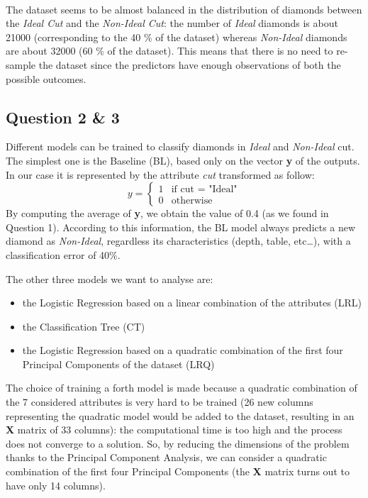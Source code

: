 \documentclass[
]{article}
\providecommand{\tightlist}{%
  \setlength{\itemsep}{0pt}\setlength{\parskip}{0pt}}
\begin{document}
~

The dataset seems to be almost balanced in the distribution of diamonds
between the \emph{Ideal Cut} and the \emph{Non-Ideal Cut}: the number of
\emph{Ideal} diamonds is about 21000 (corresponding to the 40 \% of the
dataset) whereas \emph{Non-Ideal} diamonds are about 32000 (60 \% of the
dataset). This means that there is no need to re-sample the dataset
since the predictors have enough observations of both the possible
outcomes.

\hypertarget{question-2-3}{%
\subsection{Question 2 \& 3}\label{question-2-3}}

Different models can be trained to classify diamonds in \emph{Ideal} and
\emph{Non-Ideal} cut. The simplest one is the Baseline (BL), based only
on the vector \textbf{y} of the outputs. In our case it is represented
by the attribute \emph{cut} transformed as follow: \[ y =
\begin{cases}
1 & \text{if cut = "Ideal"} \\
0 & \text{otherwise}
\end{cases} \] By computing the average of \textbf{y}, we obtain the
value of 0.4 (as we found in Question 1). According to this information,
the BL model always predicts a new diamond as \emph{Non-Ideal},
regardless its characteristics (depth, table, etc\ldots), with a
classification error of 40\%.

The other three models we want to analyse are:

\begin{itemize}
\tightlist
\item
  the Logistic Regression based on a linear combination of the
  attributes (LRL)
\item
  the Classification Tree (CT)
\item
  the Logistic Regression based on a quadratic combination of the first
  four Principal Components of the dataset (LRQ)
\end{itemize}

The choice of training a forth model is made because a quadratic
combination of the 7 considered attributes is very hard to be trained
(26 new columns representing the quadratic model would be added to the
dataset, resulting in an \textbf{X} matrix of 33 columns): the
computational time is too high and the process does not converge to a
solution. So, by reducing the dimensions of the problem thanks to the
Principal Component Analysis, we can consider a quadratic combination of
the first four Principal Components (the \textbf{X} matrix turns out to
have only 14 columns).
\end{document}
